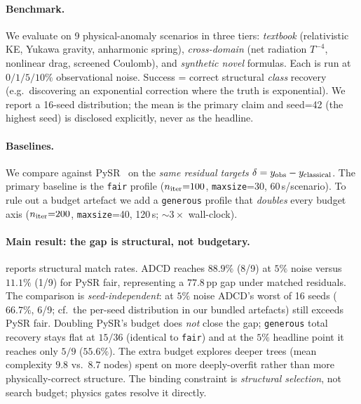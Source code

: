 \documentclass{article}
\begin{document}
\paragraph{Benchmark.}
We evaluate on 9 physical-anomaly scenarios in three tiers: \emph{textbook} (relativistic KE, Yukawa gravity, anharmonic spring), \emph{cross-domain} (net radiation $T^{-4}$, nonlinear drag, screened Coulomb), and \emph{synthetic novel} formulas. Each is run at $0/1/5/10\%$ observational noise. Success = correct structural \emph{class} recovery (e.g.\ discovering an exponential correction where the truth is exponential). We report a 16-seed distribution; the mean is the primary claim and seed=42 (the highest seed) is disclosed explicitly, never as the headline.

\paragraph{Baselines.}
We compare against PySR~\cite{cranmer2020pysr} on the \emph{same residual targets} $\delta=y_{\rm obs}-y_{\rm classical}$. The primary baseline is the \texttt{fair} profile ($n_{\rm iter}{=}100$, \texttt{maxsize}{=}30, 60\,s/scenario). To rule out a budget artefact we add a \texttt{generous} profile that \emph{doubles} every budget axis ($n_{\rm iter}{=}200$, \texttt{maxsize}{=}40, 120\,s; $\sim3\times$ wall-clock).

\paragraph{Main result: the gap is structural, not budgetary.}
 reports structural match rates. ADCD reaches $88.9\%$ (8/9) at $5\%$ noise versus $11.1\%$ (1/9) for PySR fair, representing a $77.8$\,pp gap under matched residuals. The comparison is \emph{seed-independent}: at $5\%$ noise ADCD's worst of 16 seeds ($66.7\%$, 6/9; cf.\ the per-seed distribution in our bundled artefacts) still exceeds PySR fair. Doubling PySR's budget does \emph{not} close the gap; \texttt{generous} total recovery stays flat at $15/36$ (identical to \texttt{fair}) and at the $5\%$ headline point it reaches only $5/9$ ($55.6\%$). The extra budget explores deeper trees (mean complexity $9.8$ vs.\ $8.7$ nodes) spent on more deeply-overfit rather than more physically-correct structure. The binding constraint is \emph{structural selection}, not search budget; physics gates resolve it directly.
\end{document}
